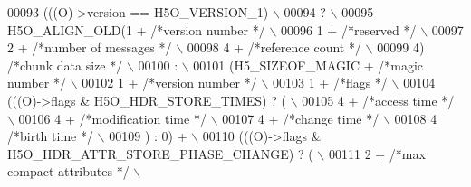 \begin{DoxyCode}
00093 \textcolor{preprocessor}{    (((O)->version == H5O\_VERSION\_1)                          \(\backslash\)}
00094 \textcolor{preprocessor}{        ?                                     \(\backslash\)}
00095 \textcolor{preprocessor}{            H5O\_ALIGN\_OLD(1 +   }\textcolor{comment}{/*version number    */}\textcolor{preprocessor}{            \(\backslash\)}
00096 \textcolor{preprocessor}{                1 +     }\textcolor{comment}{/*reserved      */}\textcolor{preprocessor}{            \(\backslash\)}
00097 \textcolor{preprocessor}{                2 +     }\textcolor{comment}{/*number of messages    */}\textcolor{preprocessor}{            \(\backslash\)}
00098 \textcolor{preprocessor}{                4 +     }\textcolor{comment}{/*reference count   */}\textcolor{preprocessor}{            \(\backslash\)}
00099 \textcolor{preprocessor}{                4)      }\textcolor{comment}{/*chunk data size   */}\textcolor{preprocessor}{            \(\backslash\)}
00100 \textcolor{preprocessor}{        :                                     \(\backslash\)}
00101 \textcolor{preprocessor}{            (H5\_SIZEOF\_MAGIC +  }\textcolor{comment}{/*magic number      */}\textcolor{preprocessor}{            \(\backslash\)}
00102 \textcolor{preprocessor}{                1 +     }\textcolor{comment}{/*version number    */}\textcolor{preprocessor}{            \(\backslash\)}
00103 \textcolor{preprocessor}{                1 +     }\textcolor{comment}{/*flags         */}\textcolor{preprocessor}{            \(\backslash\)}
00104 \textcolor{preprocessor}{                (((O)->flags & H5O\_HDR\_STORE\_TIMES) ? (               \(\backslash\)}
00105 \textcolor{preprocessor}{                  4 +       }\textcolor{comment}{/*access time       */}\textcolor{preprocessor}{            \(\backslash\)}
00106 \textcolor{preprocessor}{                  4 +       }\textcolor{comment}{/*modification time */}\textcolor{preprocessor}{            \(\backslash\)}
00107 \textcolor{preprocessor}{                  4 +       }\textcolor{comment}{/*change time       */}\textcolor{preprocessor}{            \(\backslash\)}
00108 \textcolor{preprocessor}{                  4     }\textcolor{comment}{/*birth time        */}\textcolor{preprocessor}{            \(\backslash\)}
00109 \textcolor{preprocessor}{                ) : 0) +                              \(\backslash\)}
00110 \textcolor{preprocessor}{                (((O)->flags & H5O\_HDR\_ATTR\_STORE\_PHASE\_CHANGE) ? (       \(\backslash\)}
00111 \textcolor{preprocessor}{                  2 +       }\textcolor{comment}{/*max compact attributes */}\textcolor{preprocessor}{           \(\backslash\)}

\end{DoxyCode}
